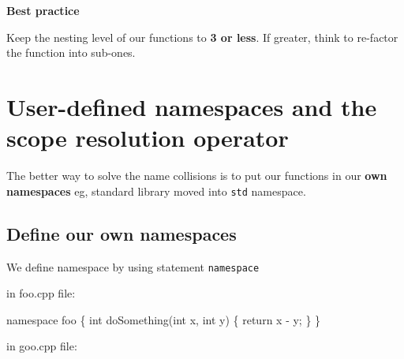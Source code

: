\documentclass[
  letterpaper,
  DIV=11,
  numbers=noendperiod]{scrreprt}
\newenvironment{Shaded}{\begin{snugshade}}{\end{snugshade}}
\newcommand{\FunctionTok}[1]{\textcolor[rgb]{0.28,0.35,0.67}{#1}}
\newcommand{\NormalTok}[1]{\textcolor[rgb]{0.00,0.23,0.31}{#1}}
\newcommand{\SpecialCharTok}[1]{\textcolor[rgb]{0.37,0.37,0.37}{#1}}
\begin{document}
\begin{tcolorbox}[enhanced jigsaw, toprule=.15mm, rightrule=.15mm, opacityback=0, breakable, leftrule=.75mm, colback=white, colframe=quarto-callout-tip-color-frame, arc=.35mm, left=2mm, bottomrule=.15mm]
\begin{minipage}[t]{5.5mm}
\textcolor{quarto-callout-tip-color}{\faLightbulb}
\end{minipage}%
\begin{minipage}[t]{\textwidth - 5.5mm}

\textbf{Best practice}\vspace{2mm}

Keep the nesting level of our functions to \textbf{3 or less}. If
greater, think to re-factor the function into sub-ones.

\end{minipage}%
\end{tcolorbox}

\hypertarget{user-defined-namespaces-and-the-scope-resolution-operator}{%
\section{User-defined namespaces and the scope resolution
operator}\label{user-defined-namespaces-and-the-scope-resolution-operator}}

The better way to solve the name collisions is to put our functions in
our \textbf{own namespaces} eg, standard library moved into \texttt{std}
namespace.

\hypertarget{define-our-own-namespaces}{%
\subsection{Define our own namespaces}\label{define-our-own-namespaces}}

We define namespace by using statement \texttt{namespace}

in foo.cpp file:

\begin{Shaded}
\begin{Highlighting}[]
\NormalTok{namespace foo}
\NormalTok{\{}
\NormalTok{    int }\FunctionTok{doSomething}\NormalTok{(int x, int y)}
\NormalTok{    \{}
\NormalTok{        return x }\SpecialCharTok{{-}}\NormalTok{ y;}
\NormalTok{    \}}
\NormalTok{\}}
\end{Highlighting}
\end{Shaded}

in goo.cpp file:
\end{document}
